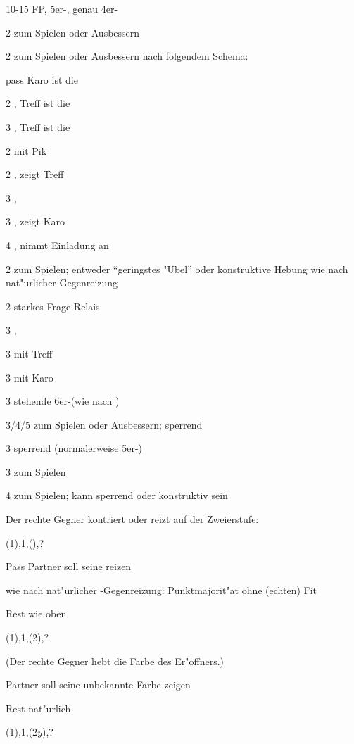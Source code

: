 \begin{appendix}
		10-15 FP, 5\pl{}er-\ufa, genau 4er-\pi
		\bdsc
			\item[2\tre] zum Spielen oder Ausbessern
			\item[2\kar] zum Spielen oder Ausbessern nach folgendem
Schema:
				\bdsc
					\item[pass] Karo ist die \ufa
					\item[2\SA] \maxi, Treff ist die \ufa
					\item[3\tre] \mini, Treff ist die \ufa
				\edsc
			\item[2\coe] \inv{}\pl mit Pik
				\bdsc
					\item[2\SA] \maxi, zeigt Treff
					\item[3\uf] \mini, \nat
					\item[3\coe] \maxi, zeigt Karo
					\item[4\pik] \maxi, nimmt Einladung an
				\edsc
			\item[2\pik] zum Spielen; entweder "`geringstes "Ubel"'
oder konstruktive Hebung wie nach nat"urlicher Gegenreizung
			\item[2\SA] starkes Frage-Relais
				\bdsc
					\item[3\uf] \mini, \nat
					\item[3\coe] \maxi mit Treff
					\item[3\pik] \maxi mit Karo
					\item[3\SA] stehende 6er-\ufa (wie nach
)
				\edsc
			\item[3\uf/4\uf/5\tre] zum Spielen oder Ausbessern;
sperrend
			\item[3\pik] sperrend (normalerweise 5er-\pi)
			\item[3\SA] zum Spielen
			\item[4\pik] zum Spielen; kann sperrend oder konstruktiv
sein
		\edsc
\edsc

Der rechte Gegner kontriert oder reizt auf der Zweierstufe:
\bdsc
	\item[(1\anybid{})\sep{}1\SA{}\sep{}(\kontra{})\sep{}?]~
		\bdsc
			\item[Pass] Partner soll seine \ufa reizen
			\item[\rekontra] wie nach nat"urlicher
\ofa-Gegenreizung: Punktmajorit"at ohne (echten) Fit
			\item[Rest] wie oben
		\edsc
	\item[(1\anybid{})\sep{}1\SA{}\sep{}(2\anybid{})\sep{}?]~
	
		(Der rechte Gegner hebt die Farbe des Er"offners.)
		\bdsc
			\item[\kontra] Partner soll seine unbekannte Farbe
zeigen
			\item[Rest] nat"urlich
		\edsc
	\item[(1\anybid{})\sep{}1\SA{}\sep{}(2\hspace{\cardskip}$y$)\sep{}?]~
	

\end{appendix}
